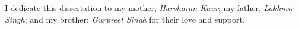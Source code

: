 I dedicate this dissertation to my mother, \textit{Harsharan Kaur};
my father, \textit{Lakhmir Singh};
and my brother; \textit{Gurpreet Singh} for their love and support.